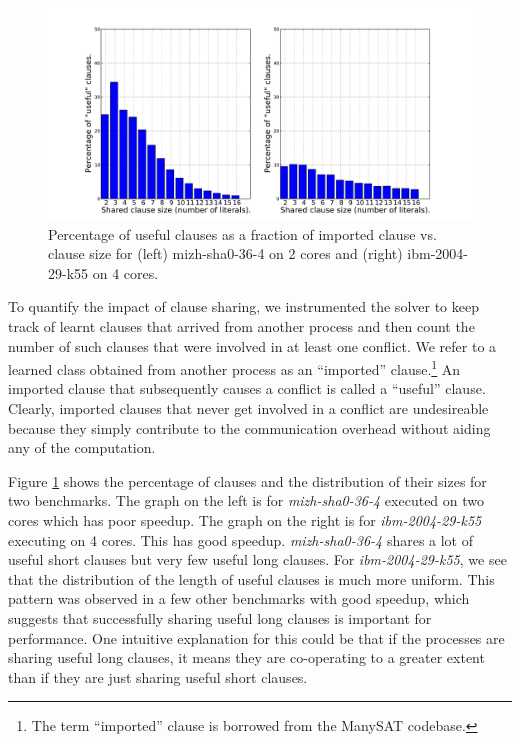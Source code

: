 \documentclass[letterpaper, compsoc, conference]{IEEEtran}
\begin{document}
\begin{figure}[htbp]
    \includegraphics[width=2\columnwidth]{images/useful.pdf}
    \caption{Percentage of useful clauses as a fraction of imported clause vs. clause size for 
             (left) mizh-sha0-36-4 on 2 cores and (right) ibm-2004-29-k55 on 4 cores.}
    \label{fig:useful}
\end{figure}


To quantify the impact of clause sharing, we instrumented the solver to keep
track of learnt clauses that arrived from another process and then count the
number of such clauses that were involved in at least one conflict.  We refer
to a learned class obtained from another process as an ``imported''
clause.\footnote{The term ``imported'' clause is borrowed from the ManySAT
codebase.} An imported clause that subsequently causes a conflict is called a
``useful'' clause. Clearly, imported clauses that never get involved in a
conflict are undesireable because they simply contribute to the communication
overhead without aiding any of the computation.

Figure \ref{fig:useful} shows the percentage of clauses and the distribution of
their sizes for two benchmarks. The graph on the left is for
\textit{mizh-sha0-36-4} executed on two cores which has poor speedup. The graph
on the right is for \textit{ibm-2004-29-k55} executing on 4 cores. This has
good speedup. \textit{mizh-sha0-36-4} shares a lot of useful short clauses but
very few useful long clauses. For \textit{ibm-2004-29-k55}, we see that the
distribution of the length of useful clauses is much more uniform. This pattern
was observed in a few other benchmarks with good speedup, which suggests that
successfully sharing useful long clauses is important for performance. One
intuitive explanation for this could be that if the processes are sharing
useful long clauses, it means they are co-operating to a greater extent than if
they are just sharing useful short clauses.
\end{document}
